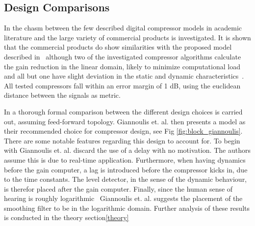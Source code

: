 \documentclass[../main2.tex]{subfiles}
\begin{document}
\subsection{Design Comparisons} \label{background_design_comp}
In \cite{bitzer2006parameter} the chasm between the few described digital compressor models in academic literature and the large variety of commercial products is investigated. It is shown that the commercial products do show similarities with the proposed model described in~\cite{mcnally1984dynamic}\cite{zolzer1997digital}\cite{dafx} although two of the investigated compressor algorithms calculate the gain reduction in the linear domain, likely to minimize computational load and all but one have slight deviation in the static and dynamic characteristics~\cite{bitzer2006parameter}. All tested compressors fall within an error margin of 1 dB, using the euclidean distance between the signals as metric.

In \cite{reiss2012tutorial} a thorough formal comparison between the different design choices is carried out, assuming feed-forward topology. Giannoulis et. al.  then presents a model as their recommended choice for compressor design, see Fig \ref{fig:block_giannoulis}. There are some notable features regarding this design to account for. To begin with Giannoulis et. al. discard the use of a delay with no motivation. The authors assume this is due to real-time application. Furthermore, when having dynamics before the gain computer, a lag is introduced before the compressor kicks in, due to the time constants. The level detector, in the sense of the dynamic behaviour, is therefor placed after the gain computer. Finally, since the human sense of hearing is roughly logarithmic~\cite{fastl2007psychoacoustics} Giannoulis et. al. suggests the placement of the smoothing filter to be in the logarithmic domain. Further analysis of these results is conducted in the theory section\ref{theory}
 
\end{document}
